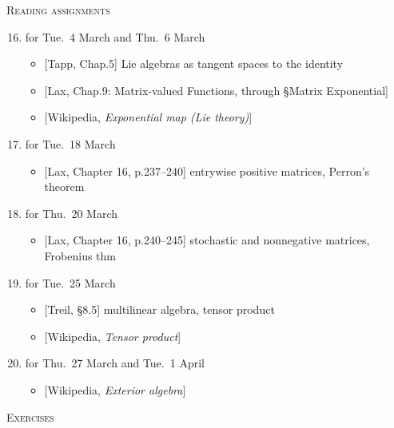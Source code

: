 \documentclass[11pt]{article}
\newcommand\total[2]{\marginpar{\colorbox{yellow}{\huge #1/#2}}}
\newcommand\0{\mathbf{0}}
\newcommand\<{\langle}
\renewcommand\>{\rangle}
\begin{document}
\noindent
\textsc{Reading assignments}\total{37}{48}%
\begin{enumerate}[itemsep=-1ex]\setcounter{enumi}{15}
\item[16--17.]\addtocounter{enumi}{2}%
for Tue.~4 March and Thu.~6 March
  \begin{itemize}
  \item{}%
  [Tapp, Chap.5] Lie algebras as tangent spaces to the identity
  \item{}%
  [Lax, Chap.9: Matrix-valued Functions, through \S Matrix Exponential]
  \item{}%
  [Wikipedia, \emph{Exponential map (Lie theory)}]
  \end{itemize}

\item%
for Tue.~18 March
  \begin{itemize}
  \item{}%
  [Lax, Chapter 16, p.237--240] entrywise positive matrices, Perron's theorem
  \end{itemize}

\item%
for Thu.~20 March
  \begin{itemize}
  \item{}%
  [Lax, Chapter 16, p.240--245] stochastic and nonnegative matrices,
  Frobenius thm
  \end{itemize}

\item%
for Tue.~25 March
  \begin{itemize}
  \item{}%
  [Treil, \S 8.5] multilinear algebra, tensor product
  \item{}%
  [Wikipedia, \emph{Tensor product}]
  \end{itemize}

\item[21--22.]\addtocounter{enumi}{2}%
for Thu.~27 March and Tue.~1 April
  \begin{itemize}
  \item{}%
  [Wikipedia, \emph{Exterior algebra}]
  \end{itemize}
\end{enumerate}

\noindent
\textsc{Exercises}%
\end{document}
